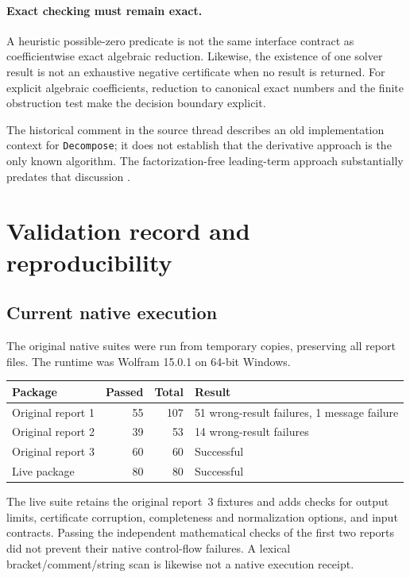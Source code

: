 \documentclass[11pt,a4paper]{article}
\numberwithin{equation}{section}
\theoremstyle{definition}
\theoremstyle{remark}
\newcommand{\code}[1]{\texttt{#1}}
\begin{document}
\paragraph{Exact checking must remain exact.}
A heuristic possible-zero predicate is not the same interface contract as
coefficientwise exact algebraic reduction. Likewise, the existence of one
solver result is not an exhaustive negative certificate when no result is
returned. For explicit algebraic coefficients, reduction to canonical exact
numbers and the finite obstruction test make the decision boundary explicit.

The historical comment in the source thread describes an old implementation
context for \code{Decompose}; it does not establish that the derivative
approach is the only known algorithm. The factorization-free leading-term
approach substantially predates that discussion \cite{KL,SE}.

\section{Validation record and reproducibility}\label{sec:verification}

\subsection{Current native execution}
The original native suites were run from temporary copies, preserving all
report files.  The runtime was Wolfram 15.0.1 on 64-bit Windows.
\begin{center}
\begin{tabular}{@{}lrrl@{}}
\toprule
Package & Passed & Total & Result\\
\midrule
Original report 1 & 55 & 107 & 51 wrong-result failures, 1 message failure\\
Original report 2 & 39 & 53 & 14 wrong-result failures\\
Original report 3 & 60 & 60 & Successful\\
Live package & 80 & 80 & Successful\\
\bottomrule
\end{tabular}
\end{center}
The live suite retains the original report~3 fixtures and adds checks for
output limits, certificate corruption, completeness and normalization
options, and input contracts.  Passing the independent mathematical checks
of the first two reports did not prevent their native control-flow failures.
A lexical bracket/comment/string scan is likewise not a native execution
receipt.
\end{document}
